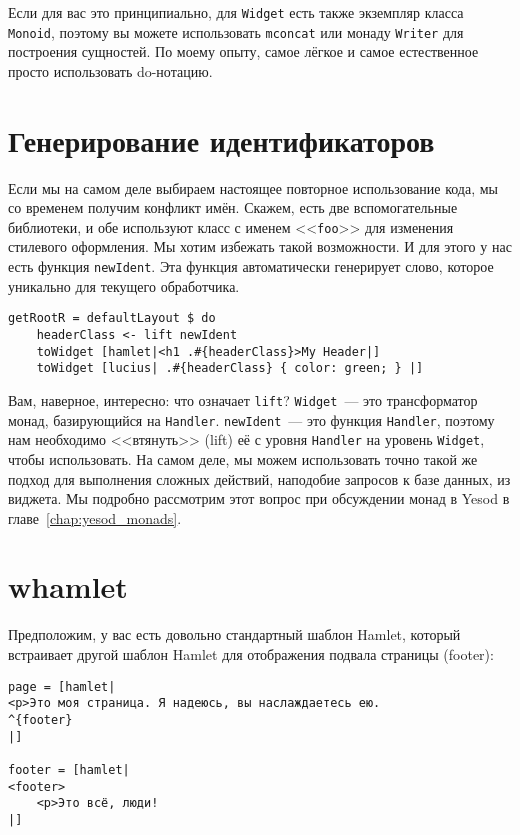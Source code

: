 \begin{remark}
    Если для вас это принципиально, для \lstinline'Widget' есть также экземпляр
    класса \lstinline'Monoid', поэтому вы можете использовать
    \lstinline'mconcat' или монаду \lstinline'Writer' для построения сущностей.
    По моему опыту, самое лёгкое и самое естественное просто использовать
    do-нотацию.
\end{remark}

\section{Генерирование идентификаторов}
Если мы на самом деле выбираем настоящее повторное использование кода, мы со
временем получим конфликт имён. Скажем, есть две вспомогательные библиотеки, и
обе используют класс с именем <<\lstinline'foo'>> для изменения стилевого
оформления. Мы хотим избежать такой возможности. И для этого у нас есть функция
\lstinline'newIdent'. Эта функция автоматически генерирует слово, которое
уникально для текущего обработчика.
\begin{lstlisting}[caption={Использование \lstinline'newIdent'}]
getRootR = defaultLayout $ do
    headerClass <- lift newIdent
    toWidget [hamlet|<h1 .#{headerClass}>My Header|]
    toWidget [lucius| .#{headerClass} { color: green; } |]
\end{lstlisting}

\begin{remark}
    Вам, наверное, интересно: что означает \lstinline'lift'?
    \lstinline'Widget'~--- это трансформатор монад, базирующийся на
    \lstinline'Handler'. \lstinline'newIdent'~--- это функция
    \lstinline'Handler', поэтому нам необходимо <<втянуть>> (lift) её с уровня
    \lstinline'Handler' на уровень \lstinline'Widget', чтобы использовать. На
    самом деле, мы можем использовать точно такой же подход для выполнения
    сложных действий, наподобие запросов к базе данных, из виджета. Мы подробно
    рассмотрим этот вопрос при обсуждении монад в Yesod в
    главе~\ref{chap:yesod_monads}.
\end{remark}

\section{whamlet}
Предположим, у вас есть довольно стандартный шаблон Hamlet, который встраивает
другой шаблон Hamlet для отображения подвала страницы (footer):
\begin{lstlisting}
page = [hamlet|
<p>Это моя страница. Я надеюсь, вы наслаждаетесь ею.
^{footer}
|]

footer = [hamlet|
<footer>
    <p>Это всё, люди!
|]
\end{lstlisting}

